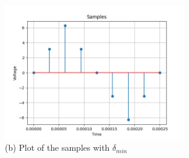\documentclass[journal,12pt,onecolumn]{IEEEtran}
\theoremstyle{remark}
\begin{document}
	\begin{figure}[htbp]
		\centering
		\includegraphics[width=0.7\textwidth]{2021/EC/24/figs/Figure_1.png}
		\caption{(b) Plot of the samples with $\delta_{min}$}
	\end{figure}
\end{document}
